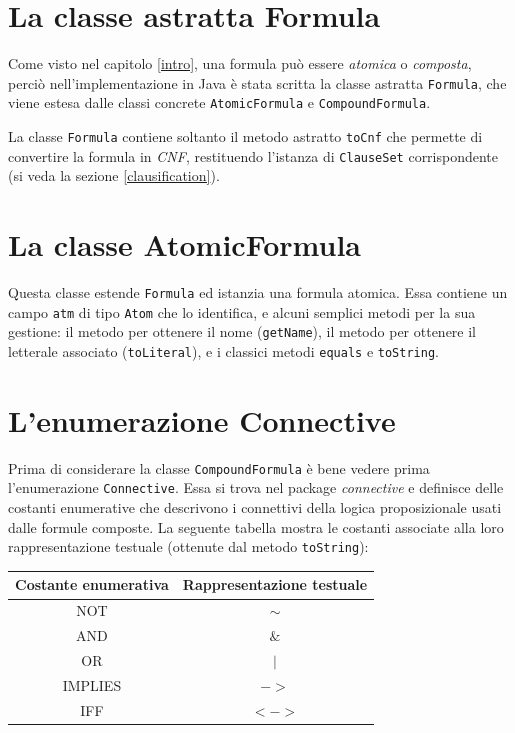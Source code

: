 \documentclass[a4paper,12pt]{report}
\begin{document}
\section{La classe astratta Formula}
Come visto nel capitolo \ref{intro}, una formula può essere \emph{atomica} o \emph{composta}, perciò nell'implementazione in Java è stata scritta la classe astratta \texttt{Formula}, che viene estesa dalle classi concrete \texttt{AtomicFormula} e \texttt{CompoundFormula}.

La classe \texttt{Formula} contiene soltanto il metodo astratto \texttt{toCnf} che permette di convertire la formula in \emph{CNF}, restituendo l'istanza di \texttt{ClauseSet} corrispondente (si veda la sezione \ref{clausification}).

\section{La classe AtomicFormula}
Questa classe estende \texttt{Formula} ed istanzia una formula atomica. Essa contiene un campo \texttt{atm} di tipo \texttt{Atom} che lo identifica, e alcuni semplici metodi per la sua gestione: il metodo per ottenere il nome (\texttt{getName}), il metodo per ottenere il letterale associato (\texttt{toLiteral}), e i classici metodi \texttt{equals} e \texttt{toString}.

\section{L'enumerazione Connective}
Prima di considerare la classe \texttt{CompoundFormula} è bene vedere prima l'enumerazione \texttt{Connective}. Essa si trova nel package \emph{connective} e definisce delle costanti enumerative che descrivono i connettivi della logica proposizionale usati dalle formule composte. La seguente tabella mostra le costanti associate alla loro rappresentazione testuale (ottenute dal metodo \texttt{toString}):
\begin{table}[H]
    \centering
    \begin{tabular}{|c||c|}
        \hline
        \textbf{Costante enumerativa} & \textbf{Rappresentazione testuale} \\
        \hline\hline
        NOT & $\sim$ \\
        \hline
        AND & $\&$ \\
        \hline
        OR & $|$ \\
        \hline
        IMPLIES & $->$ \\
        \hline
        IFF & $<->$ \\
        \hline
    \end{tabular}
\end{table}
\end{document}
